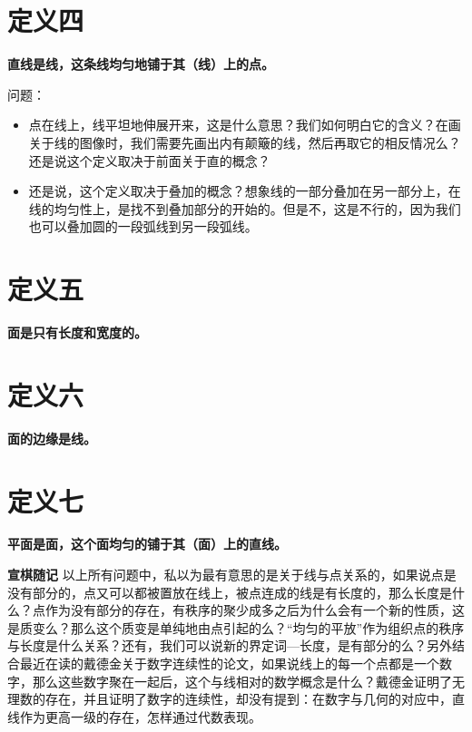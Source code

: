 \documentclass[
]{book}
\providecommand{\tightlist}{%
  \setlength{\itemsep}{0pt}\setlength{\parskip}{0pt}}
\begin{document}
\hypertarget{ux5b9aux4e49ux56db}{%
\section{定义四}\label{ux5b9aux4e49ux56db}}

\textbf{直线是线，这条线均匀地铺于其（线）上的点。}

问题：

\begin{itemize}
\tightlist
\item
  点在线上，线平坦地伸展开来，这是什么意思？我们如何明白它的含义？在画关于线的图像时，我们需要先画出内有颠簸的线，然后再取它的相反情况么？还是说这个定义取决于前面关于直的概念？
\item
  还是说，这个定义取决于叠加的概念？想象线的一部分叠加在另一部分上，在线的均匀性上，是找不到叠加部分的开始的。但是不，这是不行的，因为我们也可以叠加圆的一段弧线到另一段弧线。
\end{itemize}

\hypertarget{ux5b9aux4e49ux4e94}{%
\section{定义五}\label{ux5b9aux4e49ux4e94}}

\textbf{面是只有长度和宽度的。}

\hypertarget{ux5b9aux4e49ux516d}{%
\section{定义六}\label{ux5b9aux4e49ux516d}}

\textbf{面的边缘是线。}

\hypertarget{ux5b9aux4e49ux4e03}{%
\section{定义七}\label{ux5b9aux4e49ux4e03}}

\textbf{平面是面，这个面均匀的铺于其（面）上的直线。}

\textbf{宣棋随记}
以上所有问题中，私以为最有意思的是关于线与点关系的，如果说点是没有部分的，点又可以都被置放在线上，被点连成的线是有长度的，那么长度是什么？点作为没有部分的存在，有秩序的聚少成多之后为什么会有一个新的性质，这是质变么？那么这个质变是单纯地由点引起的么？``均匀的平放''作为组织点的秩序与长度是什么关系？还有，我们可以说新的界定词---长度，是有部分的么？另外结合最近在读的戴德金关于数字连续性的论文，如果说线上的每一个点都是一个数字，那么这些数字聚在一起后，这个与线相对的数学概念是什么？戴德金证明了无理数的存在，并且证明了数字的连续性，却没有提到：在数字与几何的对应中，直线作为更高一级的存在，怎样通过代数表现。
\end{document}
